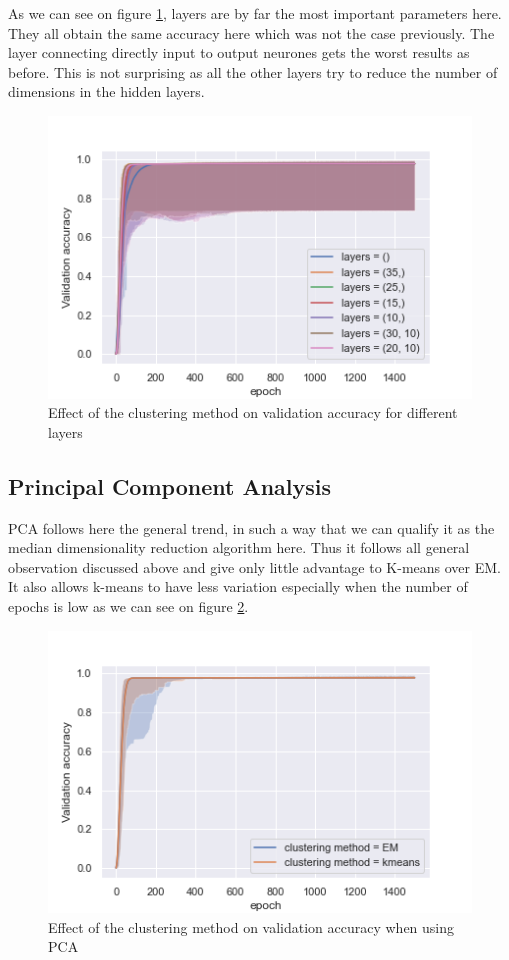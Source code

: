 \documentclass[twocolumn, 10pt]{article}
\begin{document}
			As we can see on figure \ref{fig:clusper_all_layers}, layers are by far the most important parameters here. They all obtain the same accuracy here which was not the case previously. The layer connecting directly input to output neurones gets the worst results as before. This is not surprising as all the other layers try to reduce the number of dimensions in the hidden layers.

			\begin{figure}[h]
				\centering
				\includegraphics[width=0.7\linewidth]{../graphics/clusper_all_epoch_val_categorical_accuracy_layers.png}
				\caption{Effect of the clustering method on validation accuracy for different layers}
				\label{fig:clusper_all_layers}
			\end{figure}
		\subsection{Principal Component Analysis}
			PCA follows here the general trend, in such a way that we can qualify it as the median dimensionality reduction algorithm here. Thus it follows all general observation discussed above and give only little advantage to K-means over EM. It also allows k-means to have less variation especially when the number of epochs is low as we can see on figure \ref{fig:clusper_pca_cm}.

			\begin{figure}[h]
				\centering
				\includegraphics[width=0.7\linewidth]{../graphics/clusper_PCA_epoch_val_categorical_accuracy_clustering_method.png}
				\caption{Effect of the clustering method on validation accuracy when using PCA}
				\label{fig:clusper_pca_cm}
			\end{figure}
\end{document}
